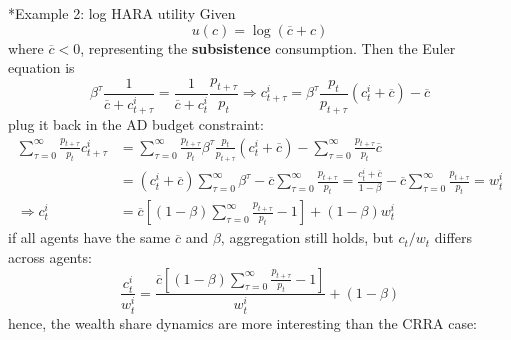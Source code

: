 \documentclass[10pt,landscape,a4paper]{article}
\makeatletter
\let\bar\overline
\renewcommand{\subsubsection}{\@startsection{subsubsection}{1}{0mm}{.2ex}{.2ex}{\bfseries}}
\makeatother
\begin{document}
\begin{multicols*}{3}
\subsubsection*{Example 2: log HARA utility}
Given
$$
u(c) = \log(\bar{c}+c)
$$
where $\bar{c}<0$, representing the \textbf{subsistence} consumption. Then the Euler equation is 
$$
\beta^{\tau}\frac{1}{\bar{c}+c_{t+\tau}^i} = \frac{1}{\bar{c}+c_t^i}\frac{p_{t+\tau}}{p_t} \Rightarrow c_{t+\tau}^i = \beta^\tau \frac{p_t}{p_{t+\tau}}(c_t^i+\bar{c})-\bar{c}
$$
plug it back in the AD budget constraint:
\begin{align*}
    \sum^{\infty}_{\tau=0}\frac{p_{t+\tau}}{p_t}c_{t+\tau}^i &= \sum^{\infty}_{\tau=0}\frac{p_{t+\tau}}{p_t}\beta^{\tau}\frac{p_t}{p_{t+\tau}}(c_t^i+\bar{c})- \sum^{\infty}_{\tau=0}\frac{p_{t+\tau}}{p_t}\bar{c}\\
    &= (c_t^i+\bar{c})\sum^{\infty}_{\tau=0}\beta^{\tau} -\bar{c}\sum^{\infty}_{\tau=0}\frac{p_{t+\tau}}{p_t} = \frac{c_t^i+\bar{c}}{1-\beta} -\bar{c}\sum^{\infty}_{\tau=0}\frac{p_{t+\tau}}{p_t} = w_t^i\\
    \Rightarrow c_t^i &= \bar{c}\left[(1-\beta)\sum^{\infty}_{\tau=0}\frac{p_{t+\tau}}{p_t}-1\right]+(1-\beta)w_t^i
\end{align*}
if all agents have the same $\bar{c}$ and $\beta$, aggregation still holds, but $c_t/w_t$ differs across agents:
$$
\frac{c_t^i}{w_t^i} = \frac{\bar{c}\left[(1-\beta)\sum^{\infty}_{\tau=0}\frac{p_{t+\tau}}{p_t}-1\right]}{w_t^i}+(1-\beta)
$$
hence, the wealth share dynamics are more interesting than the CRRA case:

\vspace{2pt}
\end{multicols*}
\end{document}
